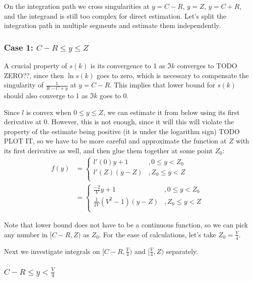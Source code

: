 On the integration path we cross singularities at $y = C - R$, $y = Z$, $y = C + R$, and the integrand is still too complex for direct estimation. Let's split the integration path in multiple segments and estimate them independently.

\subsubsection{Case 1: $C - R \le y \le Z$}
A crucial property of $s(k)$ is its convergence to 1 as $\Im k$ converges to TODO ZERO??, since then $\ln s(k)$ goes to zero, which is necessary to compensate the singularity of $\frac{1}{R - C + y}$ at $y = C - R$. 
This implies that lower bound for $s(k)$ should also converge to $1$ as $\Im k$ goes to $0$.

Since $l$ is convex when $0 \le y \le Z$, we can estimate it from below using its first derivative at $0$. However, this is not enough, since it will this will violate the property of the estimate being positive (it is under the logarithm sign) TODO PLOT IT, so we have to be more careful and approximate the function at $Z$ with its first derivative as well, and then glue them together at some point $Z_0$:
\begin{align*}
f(y)
& = 
\begin{cases}
l'(0) y + 1   &, 0 \le y < Z_0  \\
l'(Z) (y - Z) &, Z_0 \le y < Z \\
\end{cases}
\\
& =
\begin{cases}
\frac{-2}{V} y + 1   &, 0 \le y < Z_0  \\
\frac{1}{2 V}(V^2 - 1) (y - Z) &, Z_0 \le y < Z \\
\end{cases}
\end{align*}

Note that lower bound does not have to be a continuous function, so we can pick any number in $[C - R, Z)$ as $Z_0$. For the ease of calculations, let's take $Z_0 = \frac{V}{4}$. 

Next we investigate integrals on $[C - R, \frac{V}{4})$ and $[\frac{V}{4}, Z)$ separately.

\subsubsection{$C - R \le y < \frac{V}{4}$}


